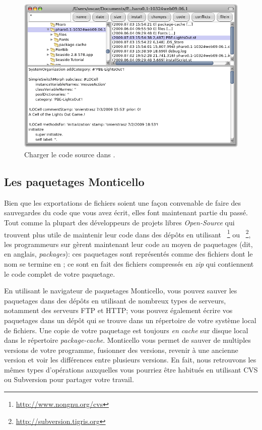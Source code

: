 \documentclass[a4paper,10pt,twoside]{book}
\begin{document}
\begin{figure}[ht]
\centerline {\includegraphics[width=\textwidth]{FileIn}}
\caption{Charger le code source dans \pharo.
}
\end{figure}

\subsection{Les paquetages Monticello}
Bien que les exportations de fichiers soient une façon convenable de
faire des sauvegardes du code que vous avez écrit, elles font
maintenant partie du passé.
Tout comme la plupart des développeurs de projets libres
\emph{Open-Source} qui trouvent plus utile de maintenir leur code dans
des dépôts en utilisant ~\footnote{\url{http://www.nongnu.org/cvs}}
ou ~\footnote{\url{http://subversion.tigris.org}}, les
programmeurs sur \pharo gèrent maintenant leur code au moyen de
paquetages  (dit, en anglais, \emph{packages}): 
ces paquetages sont représentés comme des fichiers dont le nom se
termine en ; ce sont en fait des fichiers compressés en
\emph{zip} qui contiennent le code complet de votre paquetage.

En utilisant le navigateur de paquetages Monticello, vous pouvez sauver les 
paquetages dans des dépôts en utilisant de nombreux types de serveurs, notamment 
des serveurs FTP et HTTP; vous pouvez également écrire vos paquetages dans un 
dépôt qui se trouve dans un répertoire de votre système local de fichiers.
Une copie de votre paquetage est toujours \emph{en cache} sur disque local 
dans le répertoire \emph{package-cache}. 
Monticello vous permet de sauver de multiples versions de votre programme, 
fusionner des versions, revenir à une ancienne version et voir les différences 
entre plusieurs versions.
En fait, nous retrouvons les mêmes types d'opérations auxquelles vous
pourriez être habitués en utilisant CVS ou Subversion pour
partager votre travail.
\end{document}
